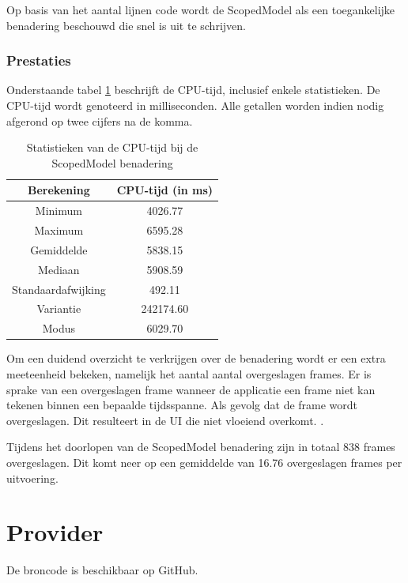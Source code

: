 Op basis van het aantal lijnen code wordt de ScopedModel als een toegankelijke benadering beschouwd die snel is uit te schrijven.

\subsubsection{Prestaties}
Onderstaande tabel \ref{table:experiment-scopedmodel-statistics} beschrijft de CPU-tijd, inclusief enkele statistieken. De CPU-tijd wordt genoteerd in milliseconden. Alle getallen worden indien nodig afgerond op twee cijfers na de komma.
\begin{table}[H]
    \centering
    \begin{tabular}{c|c}
        \textbf{Berekening} & \textbf{CPU-tijd (in ms)}  \\ \hline
        Minimum             & 4026.77                    \\ \hline
        Maximum             & 6595.28                    \\ \hline
        Gemiddelde          & 5838.15                    \\ \hline
        Mediaan             & 5908.59                    \\ \hline
        Standaardafwijking  & 492.11                     \\ \hline
        Variantie           & 242174.60                  \\ \hline
        Modus               & 6029.70                      \\                
    \end{tabular}
    \caption{Statistieken van de CPU-tijd bij de ScopedModel benadering}
    \label{table:experiment-scopedmodel-statistics}
\end{table}

Om een duidend overzicht te verkrijgen over de benadering wordt er een extra meeteenheid bekeken, namelijk het aantal aantal overgeslagen frames. Er is sprake van een overgeslagen frame wanneer de applicatie een frame niet kan tekenen binnen een bepaalde tijdsspanne. Als gevolg dat de frame wordt overgeslagen. Dit resulteert in de UI die niet vloeiend overkomt. \autocite{Flutter2019d}.

Tijdens het doorlopen van de ScopedModel benadering zijn in totaal 838 frames overgeslagen. Dit komt neer op een gemiddelde van 16.76 overgeslagen frames per uitvoering.

\section{Provider}
De broncode is beschikbaar op GitHub. \autocite{DeVrient2019b}
